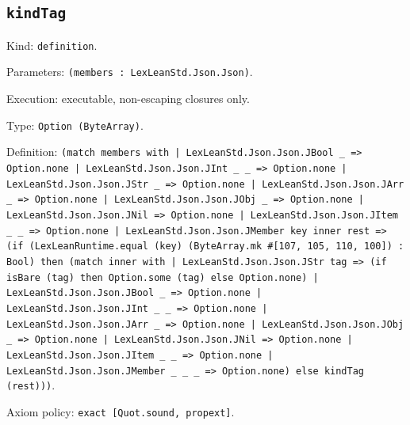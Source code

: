 \documentclass[11pt]{article}
\begin{document}
\subsection*{\texttt{kindTag}}
\noindent Kind: \texttt{definition}.\par
\noindent Parameters: \texttt{(members : LexLeanStd.Json.Json)}.\par
\noindent Execution: executable, non-escaping closures only.\par
\noindent Type: \texttt{Option (ByteArray)}.\par
\noindent Definition: \texttt{(match members with | LexLeanStd.Json.Json.JBool \_ => Option.none | LexLeanStd.Json.Json.JInt \_ \_ => Option.none | LexLeanStd.Json.Json.JStr \_ => Option.none | LexLeanStd.Json.Json.JArr \_ => Option.none | LexLeanStd.Json.Json.JObj \_ => Option.none | LexLeanStd.Json.Json.JNil => Option.none | LexLeanStd.Json.Json.JItem \_ \_ => Option.none | LexLeanStd.Json.Json.JMember key inner rest => (if (LexLeanRuntime.equal (key) (ByteArray.mk \#[107, 105, 110, 100]) : Bool) then (match inner with | LexLeanStd.Json.Json.JStr tag => (if isBare (tag) then Option.some (tag) else Option.none) | LexLeanStd.Json.Json.JBool \_ => Option.none | LexLeanStd.Json.Json.JInt \_ \_ => Option.none | LexLeanStd.Json.Json.JArr \_ => Option.none | LexLeanStd.Json.Json.JObj \_ => Option.none | LexLeanStd.Json.Json.JNil => Option.none | LexLeanStd.Json.Json.JItem \_ \_ => Option.none | LexLeanStd.Json.Json.JMember \_ \_ \_ => Option.none) else kindTag (rest)))}.\par
\noindent Axiom policy: \texttt{exact [Quot.sound, propext]}.\par
\end{document}
